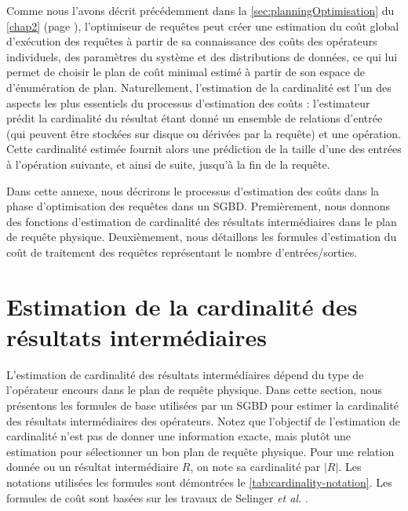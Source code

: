 \label{annex:CostModelEstimations}
Comme nous l'avons décrit précédemment dans la \ref{sec:planningOptimisation} du \ref{chap2} (page \pageref{sec:planningOptimisation}), l'optimiseur de requêtes peut créer une estimation du coût global d'exécution des requêtes à partir de sa connaissance des coûts des opérateurs individuels, des paramètres du système et des distributions de données, ce qui lui permet de choisir le plan de coût minimal estimé à partir de son espace de d’énumération de plan.
Naturellement, l'estimation de la cardinalité est l'un des aspects les plus essentiels du processus d'estimation des coûts : l'estimateur prédit la cardinalité du résultat étant donné un ensemble de relations d'entrée (qui peuvent être stockées sur disque ou dérivées par la requête) et une opération. Cette cardinalité estimée fournit alors une prédiction de la taille d'une des entrées à l'opération suivante, et ainsi de suite, jusqu'à la fin de la requête.

Dans cette annexe, nous décrirons le processus d'estimation des coûts dans la phase d'optimisation des requêtes dans un SGBD. Premièrement, nous donnons des fonctions d'estimation de cardinalité des résultats intermédiaires dans le plan de requête physique. Deuxièmement, nous détaillons les formules d'estimation du coût de traitement des requêtes représentant le nombre d'entrées/sorties.

\section{Estimation de la cardinalité des résultats intermédiaires}\label{sec:cardinalityEstimation}
L'estimation de cardinalité des résultats intermédiaires dépend du type de l'opérateur encours dans le plan de requête physique. Dans cette section, nous présentons les formules de base utilisées par un SGBD pour estimer la cardinalité des résultats intermédiaires des opérateurs. Notez que l'objectif de l'estimation de cardinalité n'est pas de donner une information exacte, mais plutôt une estimation pour sélectionner un bon plan de requête physique.
Pour une relation donnée ou un résultat intermédiaire $R$, on note sa cardinalité par $|R|$. Les notations utilisées les formules sont démontrées le \ref{tab:cardinality-notation}. Les formules de coût sont basées sur les travaux de Selinger \textit{et al.} \cite{Selinger79}.

